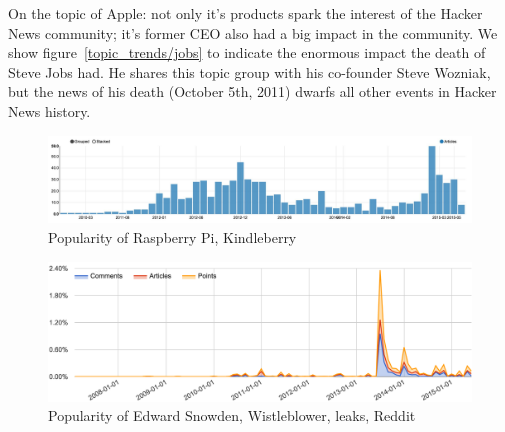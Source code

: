 On the topic of Apple: not only it's products spark the interest of the Hacker News community; it's former CEO also had a big impact in the community. We show figure~\ref{topic_trends/jobs} to indicate the enormous impact the death of Steve Jobs had. He shares this topic group with his co-founder Steve Wozniak, but the news of his death (October 5th, 2011) dwarfs all other events in Hacker News history.

\begin{figure}[H] %
	\caption{Popularity of Raspberry Pi, Kindleberry}
	\label{fig:trend_raspberry}
	\centering
	\includegraphics[width=14cm]{topic_trends/raspberry}
\end{figure}

\begin{figure}[H] %
	\caption{Popularity of Edward Snowden, Wistleblower, leaks, Reddit}
	\label{fig:trend_snowden}
	\centering
	\includegraphics[width=14cm]{topic_trends/snowden_relative}
\end{figure}
\lipsum[1]
